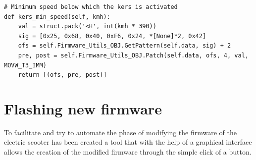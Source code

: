 \documentclass[binding=0.6cm,LaM,noexaminfo]{sapthesis}
\begin{document}
\newpage
\begin{lstlisting}[language=iPython, firstnumber=53]
# Minimum speed below which the kers is activated
def kers_min_speed(self, kmh):
    val = struct.pack('<H', int(kmh * 390))
    sig = [0x25, 0x68, 0x40, 0xF6, 0x24, *[None]*2, 0x42]
    ofs = self.Firmware_Utils_OBJ.GetPattern(self.data, sig) + 2
    pre, post = self.Firmware_Utils_OBJ.Patch(self.data, ofs, 4, val, MOVW_T3_IMM)
    return [(ofs, pre, post)]
\end{lstlisting}

\newpage
\section{Flashing new firmware}
To facilitate and try to automate the phase of modifying the firmware of the electric scooter has been created a tool that with the help of a graphical interface allows the creation of the modified firmware through the simple click of a button.
\end{document}
